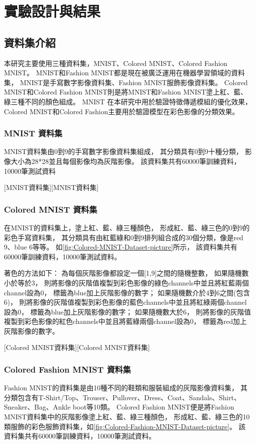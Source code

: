 \documentclass[class=NCU\_thesis, crop=false]{standalone}
\begin{document}
\chapter{實驗設計與結果}
\section{資料集介紹}
本研究主要使用三種資料集，MNIST\cite{726791}、Colored MNIST、Colored Fashion MNIST。
MNIST和Fashion MNIST都是現在被廣泛運用在機器學習領域的資料集，
MNIST是手寫數字影像資料集、Fashion MNIST服飾影像資料集。 
Colored MNIST和Colored Fashion MNIST則是將MNIST和Fashion MNIST塗上紅、藍、綠三種不同的顏色組成。
MNIST 在本研究中用於驗證特徵傳遞模組的優化效果，
Colored MNIST和Colored Fashion主要用於驗證模型在彩色影像的分類效果。
\pagebreak
    \subsection{MNIST 資料集}
    MNIST資料集由0到9的手寫數字影像資料集組成，
    其分類具有0到9十種分類，
    影像大小為28*28並且每個影像均為灰階影像。
    該資料集共有60000筆訓練資料，10000筆測試資料

    [MNIST資料集][MNIST資料集]
    \pagebreak
    \subsection{Colored MNIST 資料集}
    在MNIST的資料集上，塗上紅、藍、綠三種顏色，
    形成紅、藍、綠三色的0到9的彩色手寫資料集，
    其分類具有由紅藍綠和0到9排列組合成的30個分類，像是red 9、blue 6等等。
    如\cref{fig:Colored-MNIST-Dataset-picture}所示，
    該資料集共有60000筆訓練資料，10000筆測試資料。

    著色的方法如下：
    為每個灰階影像都設定一個[1,9]之間的隨機整數，
    如果隨機數小於等於3，
    則將影像的灰階值複製到彩色影像的綠色channels中並且將紅藍兩個channel設為0，
    標籤為blue加上灰階影像的數字；
    如果隨機數介於4到6之間(包含6)，
    則將影像的灰階值複製到彩色影像的藍色channels中並且將紅綠兩個channel設為0，
    標籤為blue加上灰階影像的數字；
    如果隨機數大於6，
    則將影像的灰階值複製到彩色影像的紅色channels中並且將藍綠兩個channel設為0，
    標籤為red加上灰階影像的數字。

    [Colored MNIST資料集][Colored MNIST資料集]
    \pagebreak
    \subsection{Colored Fashion MNIST 資料集}
    Fashion MNIST\cite{xiao2017fashionmnist}的資料集是由10種不同的鞋類和服裝組成的灰階影像資料集，
    其分類包含有T-Shirt/Top、Trouser、Pullover、Dress、Coat、Sandals、Shirt、Sneaker、Bag、Ankle boot等10類。
    Colored Fashion MNIST便是將Fashion MNIST資料集中的灰階影像塗上紅、藍、綠三種顏色，
    形成紅、藍、綠三色的10類服飾的彩色服飾資料集，如\cref{fig:Colored-Fashion-MNIST-Dataset-picture}。
    該資料集共有60000筆訓練資料，10000筆測試資料。
\end{document}
